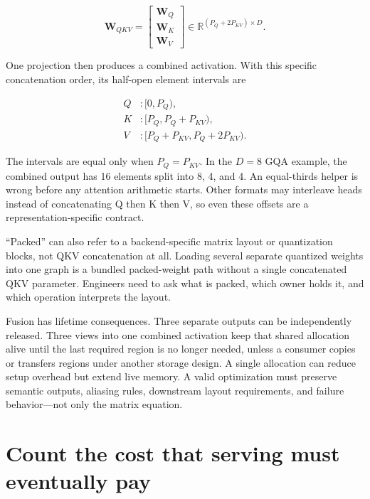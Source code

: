 \begin{equation}
\mathbf{W}_{QKV}=
\begin{bmatrix}\mathbf{W}_Q\\\mathbf{W}_K\\\mathbf{W}_V\end{bmatrix}
\in\mathbb{R}^{(P_Q+2P_{KV})\times D}.
\end{equation}

One projection then produces a combined activation. With this specific
concatenation order, its half-open element intervals are

\begin{equation}
\begin{aligned}
Q&:[0,P_Q),\\
K&:[P_Q,P_Q+P_{KV}),\\
V&:[P_Q+P_{KV},P_Q+2P_{KV}).
\end{aligned}
\end{equation}

The intervals are equal only when \(P_Q=P_{KV}\). In the \(D=8\) GQA
example, the combined output has 16 elements split into 8, 4, and 4. An
equal-thirds helper is wrong before any attention arithmetic starts.
Other formats may interleave heads instead of concatenating Q then K
then V, so even these offsets are a representation-specific contract.

``Packed'' can also refer to a backend-specific matrix layout or
quantization blocks, not QKV concatenation at all. Loading several
separate quantized weights into one graph is a bundled packed-weight
path without a single concatenated QKV parameter. Engineers need to ask
what is packed, which owner holds it, and which operation interprets the
layout.

Fusion has lifetime consequences. Three separate outputs can be
independently released. Three views into one combined activation keep
that shared allocation alive until the last required region is no longer
needed, unless a consumer copies or transfers regions under another
storage design. A single allocation can reduce setup overhead but extend
live memory. A valid optimization must preserve semantic outputs,
aliasing rules, downstream layout requirements, and failure
behavior---not only the matrix equation.

\section{Count the cost that serving must eventually
pay}\label{count-the-cost-that-serving-must-eventually-pay}

